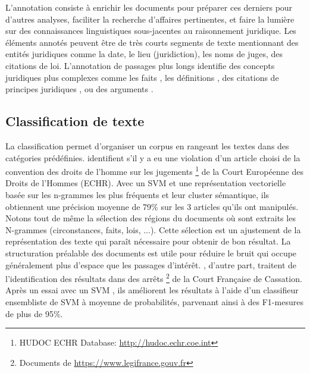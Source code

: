 L'annotation consiste à enrichir les documents pour préparer ces derniers pour d'autres analyses, faciliter la recherche d'affaires pertinentes, et faire la lumière sur des connaissances linguistiques sous-jacentes au raisonnement juridique. Les éléments annotés peuvent être de très courts segments de texte mentionnant des entités juridiques \citep{Waltl2016lexia, wyner2010extractlegalelts} comme la date, le lieu (juridiction), les noms de juges, des citations de loi.  L'annotation de passages plus longs identifie des concepts juridiques plus complexes comme les faits \citep{wyner2010extractlegalelts, Wyner2010extractcasefactor, Shulayeva2017recognfactprincip}, les définitions \citep{Waltl2016lexia}, des citations de principes juridiques \citep{Shulayeva2017recognfactprincip}, ou des arguments \citep{WynerMoens2010mineargument}.


\subsection{Classification de texte}
La classification permet d'organiser un corpus en rangeant les textes dans des catégories prédéfinies.  \cite{Aletras2016predictDecisionECHR} identifient s'il y a eu une violation d'un article choisi de la convention des droits de l'homme sur les jugements \footnote{HUDOC ECHR Database: \url{http://hudoc.echr.coe.int}} de la Court Européenne des Droits de l'Hommes (ECHR). Avec un SVM et une représentation vectorielle basée sur les n-grammes les plus fréquents et leur cluster sémantique, ils obtiennent une précision moyenne de 79\% sur les 3 articles qu'ils ont manipulés. Notons tout de même la sélection des régions du documents où sont extraits les N-grammes (circonstances, faits, lois, ...). Cette sélection est un ajustement de la représentation des texte qui paraît nécessaire pour obtenir de bon résultat. La structuration préalable des documents est utile pour réduire le bruit qui occupe généralement plus d'espace que les passages d'intérêt. \cite{sulea2017legalEnsSVM}, d'autre part, traitent de l'identification des résultats dans des arrêts \footnote{Documents de \url{https://www.legifrance.gouv.fr}} de la Court Française de Cassation. Après un essai avec un SVM \citep{Sulea2017predictareadecision}, ils améliorent les résultats à l'aide d'un classifieur ensembliste de SVM à moyenne de probabilités, parvenant ainsi à des F1-mesures de plus de 95\%. 

